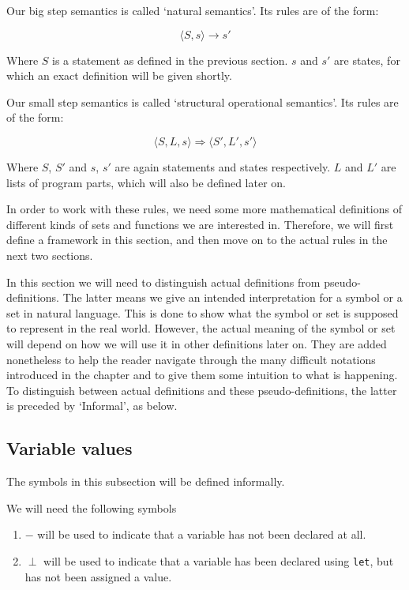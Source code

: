 Our big step semantics is called `natural semantics'. Its rules are of the form: 

$$\langle S, s \rangle \to s'$$

Where $S$ is a statement as defined in the previous section. $s$ and $s'$ are states, for which an exact definition will be given shortly. 

Our small step semantics is called `structural operational semantics'. Its rules are of the form:

$$\langle S, L, s \rangle \Rightarrow \langle S', L', s' \rangle$$

Where $S$, $S'$ and $s$, $s'$ are again statements and states respectively. $L$ and $L'$ are lists of program parts, which will also be defined later on. 

In order to work with these rules, we need some more mathematical definitions of different kinds of sets and functions we are interested in. Therefore, we will first define a framework in this section, and then move on to the actual rules in the next two sections. 

In this section we will need to distinguish actual definitions from pseudo-definitions. The latter means we give an intended interpretation for a symbol or a set in natural language. This is done to show what the symbol or set is supposed to represent in the real world. However, the actual meaning of the symbol or set will depend on how we will use it in other definitions later on. They are added nonetheless to help the reader navigate through the many difficult notations introduced in the chapter and to give them some intuition to what is happening. To distinguish between actual definitions and these pseudo-definitions, the latter is preceded by `Informal', as below. 

\subsection*{Variable values}
The symbols in this subsection will be defined informally.  

\begin{infdefinition}
We will need the following symbols 
\begin{enumerate}[noitemsep, label={\roman*)}]
    \item $-$ will be used to indicate that a variable has not been declared at all.
    \item $\perp$ will be used to indicate that a variable has been declared using \verb|let|, but has not been assigned a value.
\end{enumerate}
\end{infdefinition}

